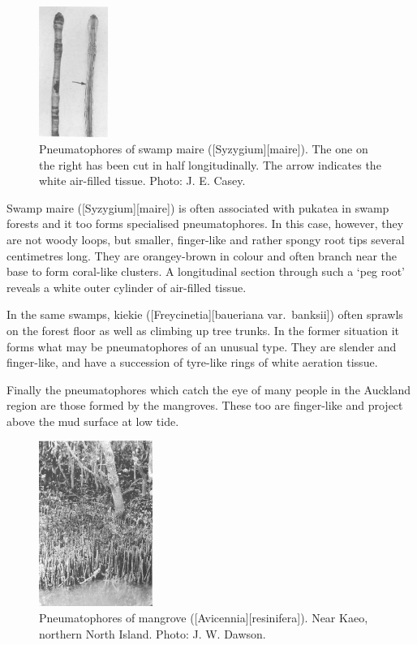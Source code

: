 \begin{figure}
	\includegraphics[width=0.2\textwidth]{graphics/figure12swampmaire.jpg}
	\centering
	\caption[Pneumatophores of swamp maire]{Pneumatophores of swamp maire ([Syzygium][maire]).
	The one on the right has been cut in half longitudinally.
	The arrow indicates the white air-filled tissue.
	Photo:  J. E. Casey.}%
	\label{fig:12swampmaire}
\end{figure}

Swamp maire ([Syzygium][maire]) is often associated with pukatea in swamp forests and it too forms specialised pneumatophores.
In this case, however, they are not woody loops, but smaller, finger-like and rather spongy root tips several centimetres long.
They are orangey-brown in colour and often branch near the base to form coral-like clusters.
A longitudinal section through such a `peg root' reveals a white outer cylinder of air-filled tissue.

In the same swamps, kiekie ([Freycinetia][baueriana var.\ banksii]) often sprawls on the forest floor as well as climbing up tree trunks.
In the former situation it forms what may be pneumatophores of an unusual type.
They are slender and finger-like, and have a succession of tyre-like rings of white aeration tissue.

Finally the pneumatophores which catch the eye of many people in the Auckland region are those formed by the mangroves.
These too are finger-like and project above the mud surface at low tide.

\begin{figure}
	\includegraphics[width=0.33\textwidth]{graphics/figure13mangrove.jpg}
	\centering
	\caption[Pneumatophores of mangrove]{Pneumatophores of mangrove ([Avicennia][resinifera]).
	Near Kaeo, northern North Island.
	Photo:  J. W. Dawson.}%
	\label{fig:13mangrove}
\end{figure}

